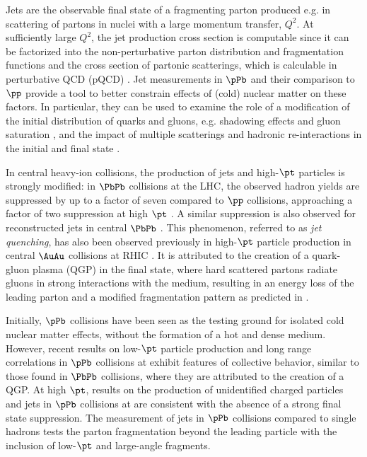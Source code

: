 Jets are the observable final state of a fragmenting parton produced e.g. in scattering of partons in nuclei with a large momentum  transfer, $Q^2$.  
%
At sufficiently large $Q^2$, the jet production cross section is
computable since it can be factorized into the non-perturbative parton distribution
and fragmentation functions and the  cross section of partonic scatterings, which is calculable
in perturbative QCD (pQCD) \cite{Col85a}.
%
Jet measurements in $\pPb$ and their comparison to $\pp$ provide a tool to better
constrain effects of (cold) nuclear matter on these factors. 
%
In particular, they can be used to examine the role of a modification of the initial distribution
of quarks and gluons, e.g. shadowing effects and gluon
saturation \cite{McLerran:2001sr,Salgado:2011wc}, and the impact of
multiple scatterings and hadronic re-interactions in the initial and
final state \cite{Krzywicki:1979gv,Accardi:2007in}.

In central heavy-ion collisions, the production of jets and high-$\pt$
particles is strongly modified: in $\PbPb$ collisions at the LHC, the
observed hadron yields are suppressed  by up to a factor of seven  compared
to $\pp$ collisions, approaching a factor of two suppression at high $\pt$
\cite{Aamodt:2010jd,Aamodt:2011vg,CMS:2012aa}.
% 
A similar suppression is also observed for reconstructed jets in
central $\PbPb$ \cite{Aad:2010bu,Chatrchyan:2012nia,Aad:2012vca,Abelev:2013kqa,Aad:2014bxa}.
%
This phenomenon, referred to as \emph{jet quenching}, has also been
observed previously in high-$\pt$ particle production in central
$\AuAu$ collisions at RHIC
\cite{Adcox:2001jp,Adler:2003qi,Ada03b,Adams:2003im,Arsene:2003yk,Back:2003qr}.
%
It is attributed to the creation of a quark-gluon plasma (QGP) in the
final state, where hard scattered partons radiate gluons in strong
interactions  with the medium, resulting  in  an energy loss of the
leading parton and a modified fragmentation pattern as predicted in \cite{Gyulassy:1990ye,Baier:1994bd}.
%

Initially, $\pPb$ collisions have been seen as the testing ground for
isolated cold nuclear matter effects, without the formation of a hot and dense medium.
% 
However, recent results on low-$\pt$ particle production and long
range correlations in $\pPb$ collisions at  \cite{CMS:2012qk,Abelev:2012ola,Aad:2013fja,Abelev:2013wsa} exhibit features of collective behavior, similar to those
found in $\PbPb$ collisions, where they are attributed to the creation of a QGP. 
%
At high $\pt$, results on the production of unidentified charged
particles
\cite{ALICE:2012mj,Abelev:2014dsa,Khachatryan:2015xaa,ATLAS-CONF-2014-029}
and jets \cite{ATLAS:2014cpa,Chatrchyan:2014hqa} in $\pPb$ collisions at  are
consistent with the absence of a strong final state suppression. 
%
The measurement of jets in $\pPb$ collisions compared to single hadrons tests the parton fragmentation beyond the leading particle with the inclusion of low-$\pt$ and large-angle fragments.

